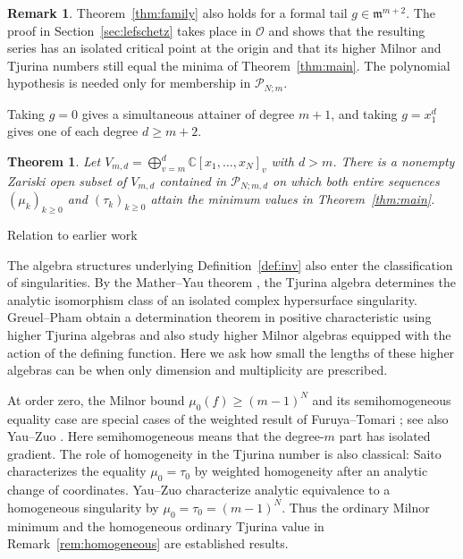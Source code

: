 \documentclass[12pt,reqno]{amsart}
\makeatletter
\renewcommand\subsection{\@startsection{subsection}{2}%
  \z@{.8\linespacing\@plus.3\linespacing}{.35\linespacing}%
  {\normalfont\bfseries}}
\newcommand{\C}{\mathbb C}
\newcommand{\mm}{\mathfrak m}
\newcommand{\Pclass}{\mathcal P_{N;m,d}}
\newcommand{\Pall}{\mathcal P_{N;m}}
\newcommand{\OO}{\mathcal O}
\newtheorem{thmintro}{Theorem}
\theoremstyle{definition}
\newtheorem{remark}[theorem]{Remark}
\makeatother
\begin{document}
\begin{remark}\label{rem:seriestails}
Theorem~\ref{thm:family} also holds for a formal tail
$g\in\mm^{m+2}$. The proof in Section~\ref{sec:lefschetz} takes
place in $\OO$ and shows that the resulting series has an isolated
critical point at the origin and that its higher Milnor and Tjurina
numbers still equal the minima of Theorem~\ref{thm:main}. The
polynomial hypothesis is needed only for membership in $\Pall$.
\end{remark}

Taking $g=0$ gives a simultaneous attainer of degree $m+1$, and
taking $g=x_1^d$ gives one of each degree $d\geq m+2$.


\begin{thmintro}\label{thm:generic}
Let $V_{m,d}=\bigoplus_{v=m}^{d}\C[x_1,\ldots,x_N]_v$ with $d > m $.
There is a nonempty Zariski open subset of $V_{m,d}$ contained
in $\Pclass$ on which both entire sequences $(\mu_k)_{k\geq0}$
and $(\tau_k)_{k\geq0}$ attain the minimum values in
Theorem~\ref{thm:main}.
\end{thmintro}


\subsection{Relation to earlier work}

The algebra structures underlying Definition~\ref{def:inv} also enter
the classification of singularities. By the Mather--Yau theorem \cite{MatherYau}, the Tjurina algebra
determines the analytic isomorphism class of an isolated complex
hypersurface singularity. Greuel--Pham \cite{GreuelPham} obtain
a determination theorem in positive characteristic using higher
Tjurina algebras and also study higher Milnor algebras equipped with
the action of the defining function. Here we ask how small the lengths
of these higher algebras can be when only dimension and multiplicity
are prescribed.


 At order zero, the Milnor bound
$\mu_0(f)\geq(m-1)^N$ and its semihomogeneous equality case are
special cases of the weighted result of Furuya--Tomari
\cite{FuruyaTomari}; see also
Yau--Zuo \cite[Theorem~2.5 and Proposition~A]{YauZuo2012}.
Here semihomogeneous means that the degree-$m$ part has isolated
gradient. The role of homogeneity in the Tjurina number is also
classical: Saito \cite{Saito} characterizes the equality
$\mu_0=\tau_0$ by weighted homogeneity after an analytic change of
coordinates. Yau--Zuo \cite[Corollary~B]{YauZuo2015} characterize
analytic equivalence to a homogeneous singularity by
$\mu_0=\tau_0=(m-1)^N$. Thus the ordinary Milnor minimum and the
homogeneous ordinary Tjurina value in Remark~\ref{rem:homogeneous}
are established results. 
\end{document}
